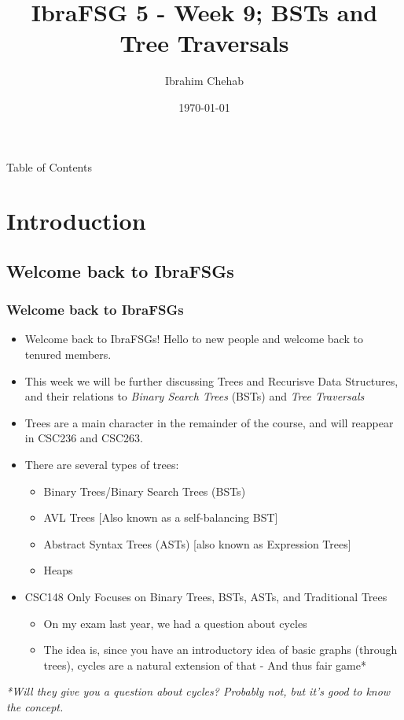 \documentclass[hyperref={colorlinks,citecolor=blue,linkcolor=blue,urlcolor=blue}, aspectratio=1610]{beamer}
\title[IbraFSG 5: BSTs and Tree Traversals]{IbraFSG\texttrademark{} 5 - Week 9; BSTs and Tree Traversals}
\author{Ibrahim Chehab}
\institute{UTM RGASC}
\date{\today}
\begin{document}
\begin{frame}
  \titlepage
\end{frame}

\begin{frame}{Table of Contents}
  \tableofcontents
\end{frame}

\section{Introduction}

\subsection{Welcome back to IbraFSGs\texttrademark{}}
\begin{frame}
  \frametitle{Welcome back to IbraFSGs\texttrademark{}}
  \begin{itemize}
  \item Welcome back to IbraFSGs\texttrademark{}! Hello to new people and welcome back to tenured members.
  \item This week we will be further discussing Trees and Recurisve Data Structures, and their relations to \textit{Binary Search Trees} (BSTs) and \textit{Tree Traversals}
  \item Trees are a main character in the remainder of the course, and will reappear in CSC236 and CSC263.
  \item There are several types of trees:
  \begin{itemize}
    \item Binary Trees/Binary Search Trees (BSTs)
    \item AVL Trees [Also known as a self-balancing BST]
    \item Abstract Syntax Trees (ASTs) [also known as Expression Trees]
    \item Heaps
  \end{itemize}
  \item CSC148 Only Focuses on Binary Trees, BSTs, ASTs, and Traditional Trees
  \begin{itemize}
    \item On my exam last year, we had a question about cycles 
    \item The idea is, since you have an introductory idea of basic graphs (through trees), cycles are a natural extension of that - And thus fair game*
  \end{itemize}
\end{itemize}
\small{\textit{*Will they give you a question about cycles? Probably not, but it's good to know the concept.}}
\end{frame}
\end{document}
